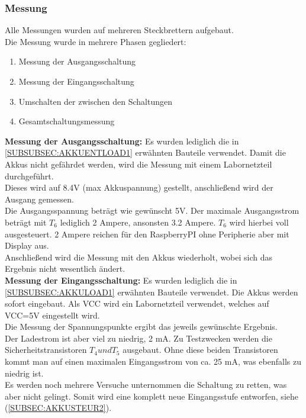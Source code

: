 \documentclass[12pt,a4paper]{article}
\begin{document}
{\newpage
\subsubsection{Messung}
\label{SUBSUBSEC:MEASUREMENT1}

Alle Messungen wurden auf mehreren Steckbrettern aufgebaut. \\
Die Messung wurde in mehrere Phasen gegliedert:
\begin{enumerate}
	\item{Messung der Ausgangsschaltung}
	\item{Messung der Eingangsschaltung}
	\item{Umschalten der zwischen den Schaltungen}
	\item{Gesamtschaltungsmessung}
\end{enumerate}

\textbf{Messung der Ausgangsschaltung:}  Es wurden lediglich die in \ref{SUBSUBSEC:AKKUENTLOAD1} erwähnten Bauteile verwendet. Damit die Akkus nicht gefährdet werden, wird die Messung mit einem Labornetzteil durchgeführt. \\
Dieses wird auf 8.4V (max Akkuspannung) gestellt, anschließend wird der Ausgang gemessen. \\
Die Ausgangsspannung beträgt wie gewünscht 5V.
Der maximale Ausgangsstrom beträgt mit $T_6$ lediglich 2 Ampere, ansonsten 3.2 Ampere. $T_6$ wird hierbei voll ausgesteuert. 2 Ampere reichen für den RaspberryPI ohne Peripherie aber mit Display aus. \\
Anschließend wird die Messung mit den Akkus wiederholt, wobei sich das Ergebnis nicht wesentlich ändert.\\[2ex]

\textbf{Messung der Eingangsschaltung:} Es wurden lediglich die in \ref{SUBSUBSEC:AKKULOAD1} erwähnten Bauteile verwendet. Die Akkus werden sofort eingebaut. Als VCC wird ein Labornetzteil verwendet, welches auf VCC=5V eingestellt wird. \\
Die Messung der Spannungspunkte ergibt das jeweils gewünschte Ergebnis. \\
Der Ladestrom ist aber viel zu niedrig, 2 mA. Zu Testzwecken werden die Sicherheitstransistoren $T_4 und T_5$ ausgebaut. Ohne diese beiden Transistoren kommt man auf einen maximalen Eingangsstrom von ca. 25 mA, was ebenfalls zu niedrig ist. \\
Es werden noch mehrere Versuche unternommen die Schaltung zu retten, was aber nicht gelingt. Somit wird eine komplett neue Eingangsstufe entworfen, siehe (\ref{SUBSEC:AKKUSTEUR2}).

}
\end{document}
